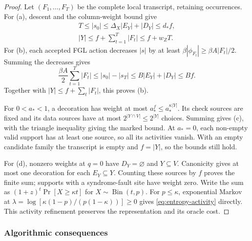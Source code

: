 \documentclass[10pt,twocolumn]{article}
\theoremstyle{definition}
\begin{document}
\begin{proof}
Let $(F_1,\ldots,F_T)$ be the complete local transcript, retaining
occurrences. For (a), descent and the column-weight bound give
\[
\begin{gathered}
 T\le |s_0|\le \Delta_X|E_Y|+|D_Y|\le d_\ast f,
 \\
 |Y|\le f+\sum_{t=1}^T|F_t|\le f+w_ZT.
\end{gathered}
\]
For (b), each accepted FGL action decreases $|s|$ by at least
$\beta|\phi_{F_t}|\ge\beta A|F_t|/2$. Summing the decreases gives
\[
 \frac{\beta A}{2}\sum_{t=1}^T|F_t|
   \le |s_0|-|s_T|\le B|E_Y|+|D_Y|\le Bf .
\]
Together with $|Y|\le f+\sum_t|F_t|$, this proves (b).

For $0<a_\ast<1$, a decoration has weight at most
$a_\ast^f\le a_\ast^{\kappa|Y|}$. Its check sources are fixed and its
data sources have at most $2^{|Y\cap V|}\le2^{|Y|}$ choices. Summing
gives (c), with the triangle inequality giving the marked bound.
At $a_\ast=0$, each non-empty valid support has at least one source,
so all its activities vanish. With an empty candidate family the
transcript is empty and $f=|Y|$, so the bounds still hold.

For (d), nonzero weights at $q=0$ have $D_Y=\varnothing$ and $Y\subseteq V$.
Canonicity gives at most one decoration for each $E_Y\subseteq Y$.
Counting these sources by $f$ proves the finite sum; supports with a
syndrome-fault site have weight zero. Write the sum as
$(1+z)^t\Pr[X\ge\kappa t]$ for $X\sim\operatorname{Bin}(t,p)$.
For $p\le\kappa$, exponential Markov at
$\lambda=\log[\kappa(1-p)/(p(1-\kappa))]\ge0$ gives
\eqref{eq:entropy-activity} directly.
This activity refinement preserves the representation and its oracle
cost.
\end{proof}

\subsubsection{Algorithmic consequences}
\end{document}
